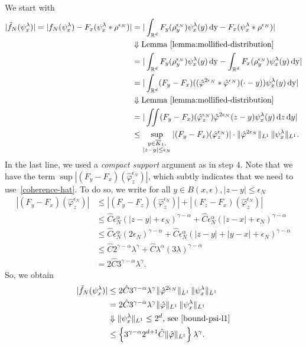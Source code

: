 We start with
\begin{align*}
    |\tilde f_N (\psi^\lambda_x) |
    = |f_N(\psi^\lambda_x) - F_x(\psi^\lambda_x * \rho^{\epsilon_N}) |
    &= |\int_{\mathbb{R}^d} F_y(\rho_y^{\epsilon_N}) \psi^{\lambda}_x(y) \, \mathrm{dy} - F_x(\psi^\lambda_x * \rho^{\epsilon_N})| \\
    &\Downarrow \text{Lemma~\ref{lemma:mollified-distribution}} \\
    &= |\int_{\mathbb{R}^d} F_y(\rho_y^{\epsilon_N}) \psi^{\lambda}_x(y) \, \mathrm{dy} - \int_{\mathbb{R}^d} F_x(\rho_y^{\epsilon_N}) \psi^{\lambda}_x(y) \, \mathrm{dy}| \\
    &= |\int_{\mathbb{R}^d} (F_y - F_x)((\hat \varphi^{2\epsilon_N} * \hat \varphi^{\epsilon_N})(\cdot - y)) \psi^{\lambda}_x(y) \, \mathrm{dy}|\\
    &\Downarrow \text{Lemma~\ref{lemma:mollified-distribution}} \\
    &= |\iint (F_y - F_x)(\hat \varphi^{\epsilon_N}_z) \hat \varphi^{2 \epsilon_N}(z-y)\psi^\lambda_x(y) \, \mathrm{d}z \, \mathrm{d}y| \\
    &\leq\sup_{\substack{y \in \overline K_1,\\|z-y|\leq\epsilon_N}} |(F_y - F_x)(\hat \varphi^{\epsilon_N}_z)| \cdot \lVert \hat \varphi^{2\epsilon_N}\rVert_{L^1} \, \lVert \psi^{\lambda}_x\rVert_{L^1}.
\end{align*}
In the last line, we used a \emph{compact support} argument as in step 4. Note that we have the term \(\sup|(F_y - F_x)(\hat \varphi^{\epsilon_N}_z)|\), which subtly indicates that we need to use~\eqref{coherence-hat}. To do so, we write for all \(y \in  B(x,\epsilon),|z-y|\leq\epsilon_N\)
\begin{align*}
    |(F_y - F_x)(\hat \varphi^{\epsilon_N}_z)| &\leq |(F_y - F_z)(\hat \varphi^{\epsilon_N}_z)| + |(F_z - F_x)(\hat \varphi^{\epsilon_N}_z)| \\
    &\leq \hat C \epsilon_N^\alpha(|z-y| + \epsilon_N)^{\gamma - \alpha} + \hat C \epsilon_N^\alpha(|z-x| + \epsilon_N)^{\gamma - \alpha} \\
    &\leq \hat C \epsilon_N^\alpha (2\epsilon_N)^{\gamma - \alpha} + \hat C \epsilon_N^\alpha (|z-y| + |y-x| + \epsilon_N)^{\gamma - \alpha} \\
    &\leq \hat C  2^{\gamma - \alpha} \lambda^{\gamma} +  \hat C  \lambda^\alpha(3\lambda)^{\gamma - \alpha} \\
    &= 2 \hat C 3^{\gamma - \alpha}\lambda^\gamma.
\end{align*}
So, we obtain
\begin{align*}
    |\tilde f_N (\psi^\lambda_x) | 
    &\leq 2 \hat C 3^{\gamma - \alpha}\lambda^\gamma \lVert \hat \varphi^{2\epsilon_N}\rVert_{L^1} \, \lVert \psi^{\lambda}_x\rVert_{L^1}\\
     &= 2 \hat C 3^{\gamma - \alpha}\lambda^\gamma \lVert \hat \varphi\rVert_{L^1} \, \lVert \psi^{\lambda}_x\rVert_{L^1} \\
     &\Downarrow \text{\(\lVert \psi^{\lambda}_x\rVert_{L^1} \leq 2^d\), see~\eqref{bound-psi-l1}} \\
     &\leq \left \{ 3^{\gamma - \alpha} 2^{d+1} \hat C  \lVert \hat \varphi\rVert_{L^1} \right \} \lambda^\gamma.
\end{align*}

